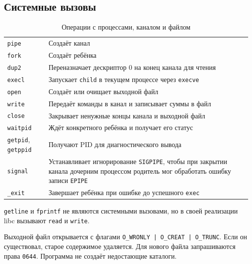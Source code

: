 \documentclass[12pt,a4paper]{article}
\begin{document}
\subsection{Системные вызовы}

\begin{table}[H]
\caption{Операции с процессами, каналом и файлом}
\begin{tabularx}{\linewidth}{|P{4.6cm}|L|}
\hline
{} &  \\ \hline
\texttt{pipe} & Создаёт канал \\ \hline
\texttt{fork} & Создаёт ребёнка \\ \hline
\texttt{dup2} & Переназначает дескриптор 0 на конец канала для чтения \\ \hline
\texttt{execl} & Запускает \texttt{child} в текущем процессе через \texttt{execve} \\ \hline
\texttt{open} & Создаёт или очищает выходной файл \\ \hline
\texttt{write} & Передаёт команды в канал и записывает суммы в файл \\ \hline
\texttt{close} & Закрывает ненужные концы канала и выходной файл \\ \hline
\texttt{waitpid} & Ждёт конкретного ребёнка и получает его статус \\ \hline
\texttt{getpid}, \texttt{getppid} & Получают PID для диагностического вывода \\ \hline
\texttt{signal} & Устанавливает игнорирование \texttt{SIGPIPE}, чтобы при закрытии канала дочерним процессом родитель мог обработать ошибку записи \texttt{EPIPE} \\ \hline
\texttt{\_exit} & Завершает ребёнка при ошибке до успешного \texttt{exec} \\ \hline
\end{tabularx}
\end{table}

\texttt{getline} и \texttt{fprintf} не являются системными вызовами, но в своей реализации libc вызывают \texttt{read} и \texttt{write}.

Выходной файл открывается с флагами \texttt{O\_WRONLY | O\_CREAT | O\_TRUNC}. Если он существовал, старое содержимое удаляется. Для нового файла запрашиваются права \texttt{0644}. Программа не создаёт недостающие каталоги.
\end{document}
